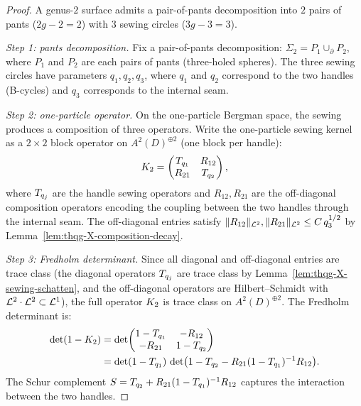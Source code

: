 \begin{proof}
A genus-$2$ surface admits a pair-of-pants decomposition into
$2$ pairs of pants ($2g-2 = 2$) with $3$ sewing circles
($3g-3 = 3$).

\emph{Step 1: pants decomposition.}
Fix a pair-of-pants decomposition: $\Sigma_2 = P_1 \cup_{\partial} P_2$,
where $P_1$ and $P_2$ are each pairs of pants (three-holed spheres).
The three sewing circles have parameters $q_1, q_2, q_3$, where
$q_1$ and $q_2$ correspond to the two handles (B-cycles) and
$q_3$ corresponds to the internal seam.

\emph{Step 2: one-particle operator.}
On the one-particle Bergman space, the sewing produces a
composition of three operators. Write the one-particle sewing
kernel as a $2 \times 2$ block operator on
$A^2(D)^{\oplus 2}$ (one block per handle):
\begin{equation}%
\sewker_2
=
\begin{pmatrix}
\sewop_{q_1} & R_{12} \\
R_{21} & \sewop_{q_2}
\end{pmatrix},
\end{equation}
where $T_{q_j}$ are the handle sewing operators and
$R_{12}, R_{21}$ are the off-diagonal composition operators
encoding the coupling between the two handles through the internal
seam. The off-diagonal entries satisfy
$\|R_{12}\|_{\mathcal{L}^2}, \|R_{21}\|_{\mathcal{L}^2} \leq C\,q_3^{1/2}$
by Lemma~\ref{lem:thqg-X-composition-decay}.

\emph{Step 3: Fredholm determinant.}
Since all diagonal and off-diagonal entries are trace class
(the diagonal operators $T_{q_j}$ are trace class by
Lemma~\ref{lem:thqg-X-sewing-schatten}, and the off-diagonal
operators are Hilbert--Schmidt with $\mathcal{L}^2 \cdot \mathcal{L}^2 \subset \mathcal{L}^1$),
the full operator $K_2$ is trace class on
$A^2(D)^{\oplus 2}$. The Fredholm determinant is:
\begin{align}
\det(1 - K_2)
&= \det\!\begin{pmatrix}
1 - T_{q_1} & -R_{12} \\
-R_{21} & 1 - T_{q_2}
\end{pmatrix}
\notag\\
&= \det(1 - T_{q_1})\,
\det\bigl(1 - T_{q_2}
- R_{21}(1-T_{q_1})^{-1}R_{12}\bigr).
\end{align}
The Schur complement
$S = T_{q_2} + R_{21}(1-T_{q_1})^{-1}R_{12}$
captures the interaction between the two handles.


\end{proof}
